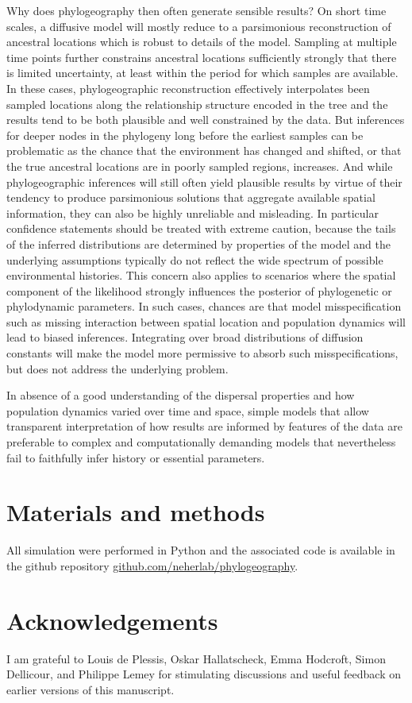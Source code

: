 \documentclass[aps,rmp, twocolumn]{revtex4}
\begin{document}
Why does phylogeography then often generate sensible results?
On short time scales, a diffusive model will mostly reduce to a parsimonious reconstruction of ancestral locations which is robust to details of the model.
Sampling at multiple time points further constrains ancestral locations sufficiently strongly that there is limited uncertainty, at least within the period for which samples are available.
In these cases, phylogeographic reconstruction effectively interpolates been sampled locations along the relationship structure encoded in the tree and the results tend to be both plausible and well constrained by the data.
But inferences for deeper nodes in the phylogeny long before the earliest samples can be problematic as the chance that the environment has changed and shifted, or that the true ancestral locations are in poorly sampled regions, increases.
And while phylogeographic inferences will still often yield plausible results by virtue of their tendency to produce parsimonious solutions that aggregate available spatial information, they can also be highly unreliable and misleading.
In particular confidence statements should be treated with extreme caution, because the tails of the inferred distributions are determined by properties of the model and the underlying assumptions typically do not reflect the wide spectrum of possible environmental histories.
This concern also applies to scenarios where the spatial component of the likelihood strongly influences the posterior of phylogenetic or phylodynamic parameters. In such cases, chances are that model misspecification such as missing interaction between spatial location and population dynamics will lead to biased inferences. Integrating over broad distributions of diffusion constants will make the model more permissive to absorb such misspecifications, but does not address the underlying problem.

In absence of a good understanding of the dispersal properties and how population dynamics varied over time and space, simple models that allow transparent interpretation of how results are informed by features of the data are preferable to complex and computationally demanding models that nevertheless fail to faithfully infer history or essential parameters.


\section*{Materials and methods}
All simulation were performed in Python and the associated code is available in the github repository \href{https://github.com/neherlab/phylogeography}{github.com/neherlab/phylogeography}.

\section*{Acknowledgements}
I am grateful to Louis de Plessis, Oskar Hallatscheck, Emma Hodcroft, Simon Dellicour, and Philippe Lemey for stimulating discussions and useful feedback on earlier versions of this manuscript.


\end{document}
